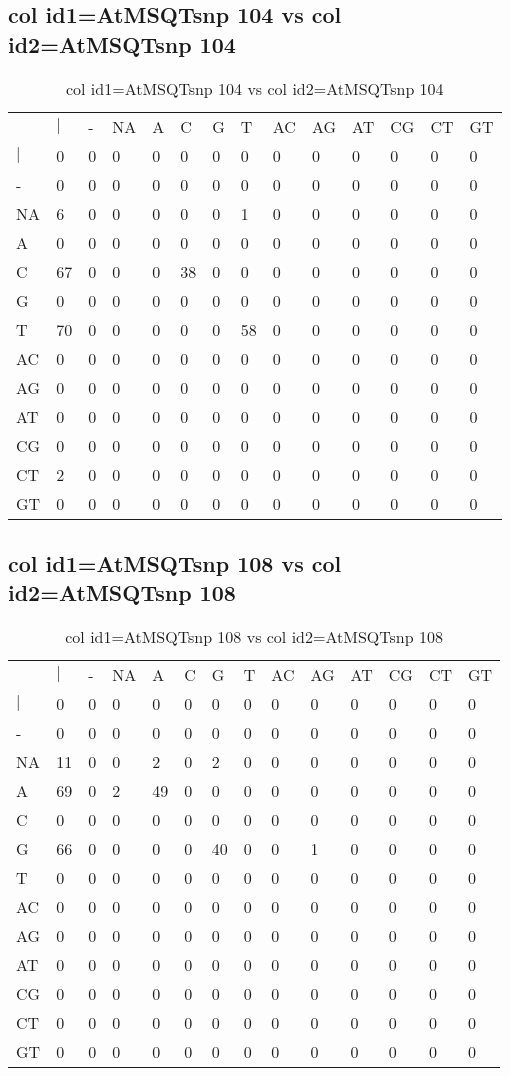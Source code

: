 \subsection{col id1=AtMSQTsnp 104 vs col id2=AtMSQTsnp 104}
\begin{center}
\begin{longtable}{|l|l|l|l|l|l|l|l|l|l|l|l|l|l|}
\caption{col id1=AtMSQTsnp 104 vs col id2=AtMSQTsnp 104} \label{table_dm492}\\
\hline
\\
\hline
&$|$&-&NA&A&C&G&T&AC&AG&AT&CG&CT&GT\\
$|$&0&0&0&0&0&0&0&0&0&0&0&0&0\\
-&0&0&0&0&0&0&0&0&0&0&0&0&0\\
NA&6&0&0&0&0&0&1&0&0&0&0&0&0\\
A&0&0&0&0&0&0&0&0&0&0&0&0&0\\
C&67&0&0&0&38&0&0&0&0&0&0&0&0\\
G&0&0&0&0&0&0&0&0&0&0&0&0&0\\
T&70&0&0&0&0&0&58&0&0&0&0&0&0\\
AC&0&0&0&0&0&0&0&0&0&0&0&0&0\\
AG&0&0&0&0&0&0&0&0&0&0&0&0&0\\
AT&0&0&0&0&0&0&0&0&0&0&0&0&0\\
CG&0&0&0&0&0&0&0&0&0&0&0&0&0\\
CT&2&0&0&0&0&0&0&0&0&0&0&0&0\\
GT&0&0&0&0&0&0&0&0&0&0&0&0&0\\
\hline
\end{longtable}
\end{center}

\subsection{col id1=AtMSQTsnp 108 vs col id2=AtMSQTsnp 108}
\begin{center}
\begin{longtable}{|l|l|l|l|l|l|l|l|l|l|l|l|l|l|}
\caption{col id1=AtMSQTsnp 108 vs col id2=AtMSQTsnp 108} \label{table_dm494}\\
\hline
\\
\hline
&$|$&-&NA&A&C&G&T&AC&AG&AT&CG&CT&GT\\
$|$&0&0&0&0&0&0&0&0&0&0&0&0&0\\
-&0&0&0&0&0&0&0&0&0&0&0&0&0\\
NA&11&0&0&2&0&2&0&0&0&0&0&0&0\\
A&69&0&2&49&0&0&0&0&0&0&0&0&0\\
C&0&0&0&0&0&0&0&0&0&0&0&0&0\\
G&66&0&0&0&0&40&0&0&1&0&0&0&0\\
T&0&0&0&0&0&0&0&0&0&0&0&0&0\\
AC&0&0&0&0&0&0&0&0&0&0&0&0&0\\
AG&0&0&0&0&0&0&0&0&0&0&0&0&0\\
AT&0&0&0&0&0&0&0&0&0&0&0&0&0\\
CG&0&0&0&0&0&0&0&0&0&0&0&0&0\\
CT&0&0&0&0&0&0&0&0&0&0&0&0&0\\
GT&0&0&0&0&0&0&0&0&0&0&0&0&0\\
\hline
\end{longtable}
\end{center}

